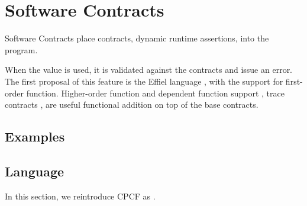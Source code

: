 \chapter{Software Contracts}
\label{chap:contracts}

Software Contracts place contracts, dynamic runtime assertions, into the program.

When the value is used, it is validated against the contracts and issue an error. The first proposal of this feature is the Effiel language \cite{meyer1992eiffel}, with the support for first-order function. Higher-order function and dependent function support \cite{findler2002contracts}, trace contracts \cite{MOY_FELLEISEN_2023}, are useful functional addition on top of the base contracts.

\section{Examples}

\section{Language \langc}

In this section, we reintroduce CPCF \cite{cpcf,completemonitors} as \langc.







